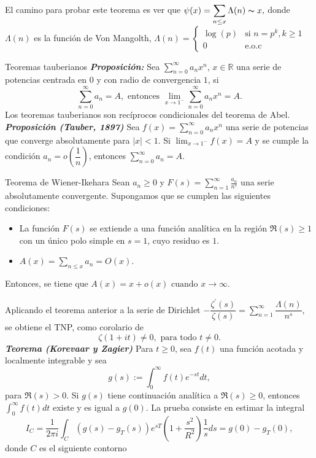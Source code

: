 \documentclass[final]{beamer}
\newcommand\R{\ensuremath{\mathbb{R}}}
\newlength{\colwidth}
\newcommand{\defi}[1]{\textbf{\emph{#1}}}
\begin{document}
\begin{frame}[t,fragile]
\begin{columns}[t]
\begin{column}{\colwidth}
\phantom{xd}\\\vspace*{0.6cm}
El camino para probar este teorema es ver que $\displaystyle\psi(x)=\sum_{n\leq x} \Lambda(n)\thicksim x,$ donde $\Lambda(n)$ es la función de Von Mangolth, $\displaystyle\Lambda(n)=\begin{cases}
    \log(p) &\text{si } n=p^k, k\geq 1\\
    0 &\text{e.o.c}
\end{cases}$
\begin{block}{Teoremas tauberianos}
\defi{Proposición: }Sea $\displaystyle \sum_{n=0}^{\infty} a_n x^n$, $x\in \R$ una serie de potencias centrada en $0$ y con radio  de convergencia $1$, si
$$\sum_{n=0}^{\infty} a_n=A,\text{ entonces } \lim_{x \to 1^-}\sum_{n=0}^{\infty} a_n x^n=A.$$
Los teoremas tauberianos son recíprocos condicionales del teorema de Abel.\\
\defi{Proposición (Tauber, 1897)} Sea $f(x)=\displaystyle\sum_{n=0}^{\infty} a_n x^n$ una serie de potencias que converge absolutamente para $|x|<1$.
Si $\lim_{x \rightarrow 1^{-}} f(x)=A$ y se cumple la condición $a_n=o\left(\dfrac{1}{n}\right)$, entonces $\displaystyle\sum_{n=0}^{\infty}a_n=A$.
\end{block}
\begin{exampleblock}{Teorema de Wiener-Ikehara}
Sean $a_n \geq 0$ y $F(s)=\displaystyle\sum_{n=1}^{\infty} \frac{a_n}{n^s}$ una serie absolutamente convergente. Supongamos que se cumplen las siguientes condiciones:
\begin{itemize}
\item La función $F(s)$ se extiende a una función analítica en la región $\Re(s) \geq 1$ con un único polo simple en $s=1$, cuyo residuo es $1$.\\
\item $A(x)=\displaystyle \sum_{n \leq x} a_n=O(x)$.
\end{itemize}
Entonces, se tiene que $A(x)=x+o(x) \text { cuando } x \rightarrow \infty \text {. }
$
\end{exampleblock}
Aplicando el teorema anterior a la serie de Dirichlet $\displaystyle-\dfrac{\zeta^{\prime}(s)}{\zeta(s)}=\sum_{n=1}^{\infty}\dfrac{\Lambda(n)}{n^s}$, se obtiene el TNP, como corolario de
$$\zeta(1+it)\neq 0, \text{ para todo } t\neq 0.$$
\defi{Teorema (Korevaar y Zagier)} Para $t \geq 0$, sea $f(t)$ una función acotada y localmente integrable y sea $$g(s):=\displaystyle\int_0^{\infty} f(t) e^{-s t} d t,$$
para $\Re(s)>0$. Si $g(s)$ tiene continuación analítica a $\Re(s) \geq 0$, entonces $\displaystyle\int_0^{\infty} f(t) d t$ existe y es igual a $g(0)$.
La prueba consiste en estimar la integral
$$I_{C}=\frac{1}{2\pi i}\int_{C}\left(g(s)-g_T(s)\right)e^{sT}\left(1+\frac{s^2}{R^2}\right)\frac{1}{s}ds=g(0)-g_T(0),$$
donde $C$ es el siguiente contorno


\end{column}
\end{columns}
\end{frame}
\end{document}
